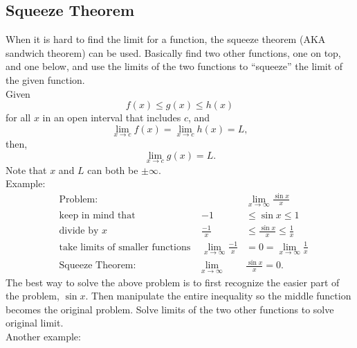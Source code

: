 \documentclass[12pt]{article}
\begin{document}
        \subsection{Squeeze Theorem}
            When it is hard to find the limit for a function, the squeeze theorem (AKA sandwich theorem) can be used. Basically find two other functions, one on top, and one below, and use the limits of the two functions to ``squeeze'' the limit of the given function.
            \\ Given
            \[ f(x) \le g(x) \le h(x) \]
            for all $x$ in an open interval that includes $c$, and
            \[ \lim_{x \to c} f(x) = \lim_{x \to c} h(x) = L, \]
            then,
            \[ \lim_{x \to c} g(x) = L. \]
            Note that $x$ and $L$ can both be $\pm \infty$.
            \newline
            \\ Example:
            \begin{align*}
                &\text{Problem:} &&\lim_{x \to \infty} \frac{\sin{x}}{x} \\[6pt]
                &\text{keep in mind that} &-1 &\le \sin{x} \le 1 \\
                &\text{divide by $x$} &\frac{-1}{x} &\le \frac{\sin{x}}{x} \le \frac{1}{x} \\[6pt]
                &\text{take limits of smaller functions } &\lim_{x \to \infty} \frac{-1}{x} &= 0 = \lim_{x \to \infty} \frac{1}{x} \\[6pt]
                &\text{Squeeze Theorem:} &\lim_{x \to \infty} &\frac{\sin{x}}{x} = 0.
            \end{align*}
            The best way to solve the above problem is to first recognize the easier part of the problem, $\sin{x}$. Then manipulate the entire inequality so the middle function becomes the original problem. Solve limits of the two other functions to solve original limit.
            \\ Another example:
\end{document}
